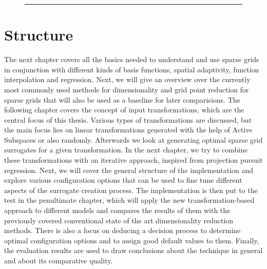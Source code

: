 \documentclass[
  a4paper,  %
  twoside,  %
  bibliography=totoc,
  headsepline,
  cleardoublepage=empty,
  parskip=half,
  draft=false
]{scrbook}
\newcommand{\delimit}{{\color{charcoal}\noindent\rule{\textwidth}{1pt}}}
\begin{document}
\begin{mdframed}[style=style]

\vspace{2.5mm}
\begin{figure}[H]

\centering
{}

\vspace{2.5mm}
\delimit
{}
\label{fig:dim_ranges}
\end{figure}
\end{mdframed}

\section{Structure}

The next chapter covers all the basics needed to understand and use sparse grids in conjunction with different kinds of basis functions, spatial adaptivity, function interpolation and regression.
Next, we will give an overview over the currently most commonly used methods for dimensionality and grid point reduction for sparse grids that will also be used as a baseline for later comparisions.
The following chapter covers the concept of input transformations, which are the central focus of this thesis.
Various types of transformations are discussed, but the main focus lies on linear transformations generated with the help of Active Subspaces or also randomly.
Afterwards we look at generating optimal sparse grid surrogates for a given transformation.
In the next chapter, we try to combine these transformations with an iterative approach, inspired from projection pursuit regression.
Next, we will cover the general structure of the implementation and explore various configuration options that can be used to fine tune different aspects of the surrogate creation process.
The implementation is then put to the test in the penultimate chapter, which will apply the new transformation-based approach to different models and compares the results of them with the previously covered conventional state of the art dimensionality reduction methods.
There is also a focus on deducing a decision process to determine optimal configuration options and to assign good default values to them.
Finally, the evaluation results are used to draw conclusions about the technique in general and about its comparative quality.
\end{document}
